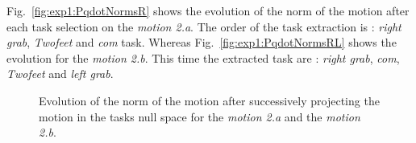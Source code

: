 \documentclass[letterpaper, 10pt, conference]{ieeeconf}      %
\begin{document}
%      
%      
%

Fig.~\ref{fig:exp1:PqdotNormsR} shows the evolution of the norm of the motion after each task selection
on the \emph{motion 2.a}. The order of the task extraction is :
\emph{right grab}, \emph{Twofeet} and \emph{com} task.
Whereas Fig.~\ref{fig:exp1:PqdotNormsRL} shows the evolution for the \emph{motion 2.b}.
This time the extracted task are : \emph{right grab},  \emph{com}, \emph{Twofeet} and \emph{left grab}.

\begin{figure}[t]
  \centering
  \subfigure[Motion 2.a]{
  \resizebox{.48\textwidth}{!} {
    
  }
  \label{fig:exp1:PqdotNormsR}
  }
  \subfigure[Motion 2.b]{
  \resizebox{.48\textwidth}{!} {
    
  }
\label{fig:exp1:PqdotNormsRL}
}
\caption{Evolution of the norm of the motion after successively projecting the motion in the tasks null space for
the \emph{motion 2.a} and the \emph{motion 2.b}.}
\end{figure}
\end{document}
